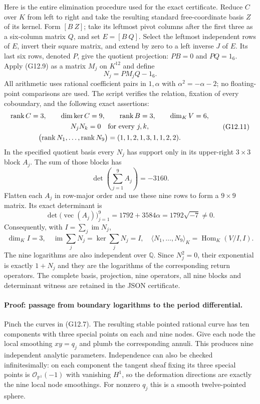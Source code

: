 Here is the entire elimination procedure used for the exact certificate.
Reduce $C$ over $K$ from left to right and take the resulting standard
free-coordinate basis $Z$ of its kernel. Form $[B\ Z]$; take its
leftmost pivot columns after the first three as a six-column matrix
$Q$, and set $E=[B\ Q]$. Select the leftmost independent rows of
$E$, invert their square matrix, and extend by zero to a left inverse
$J$ of $E$. Its last six rows, denoted $P$, give the quotient
projection: $PB=0$ and $PQ=1_6$. Apply (G12.9) as a matrix $M_j$ on
$K^{12}$ and define
\[
N_j=PM_jQ-1_6.
\tag{G12.10}
\]
All arithmetic uses rational coefficient pairs in $1,\alpha$ with
$\alpha^2=-\alpha-2$; no floating-point comparisons are used.
The script verifies the relation, fixation of every coboundary,
and the following exact assertions:
\[
\begin{gathered}
\operatorname{rank}C=3,\qquad \dim\ker C=9,\qquad
\operatorname{rank}B=3,\qquad\dim_KV=6,\\
N_jN_k=0\quad\hbox{for every }j,k,\\
\bigl(\operatorname{rank}N_1,\ldots,\operatorname{rank}N_9\bigr)
=(1,1,2,1,3,1,1,2,2).
\end{gathered}
\tag{G12.11}
\]
In the specified quotient basis every $N_j$ has support only in its
upper-right $3\times3$ block $A_j$. The sum of those blocks has
\[
\det\left(\sum_{j=1}^9 A_j\right)=-3160.
\tag{G12.12}
\]
Flatten each $A_j$ in row-major order and use these nine rows to
form a $9\times9$ matrix. Its exact determinant is
\[
\det\bigl(\operatorname{vec}(A_j)\bigr)_{j=1}^9
=1792+3584\alpha=1792\sqrt{-7}\ne0.
\tag{G12.13}
\]
Consequently, with $I=\sum_j\operatorname{im}N_j$,
\[
\dim_K I=3,\quad
\operatorname{im}\sum_jN_j=\ker\sum_jN_j=I,\quad
\langle N_1,\ldots,N_9\rangle_K
=\operatorname{Hom}_K(V/I,I).
\tag{G12.14}
\]
The nine logarithms are also independent over $\mathbb Q$.
Since $N_j^2=0$, their exponential is exactly $1+N_j$ and they
are the logarithms of the corresponding return operators.
The complete basis, projection, nine operators, all nine blocks
and determinant witness are retained in the JSON certificate.

\paragraph{Proof: passage from boundary logarithms to the period differential.}
Pinch the curves in (G12.7). The resulting stable pointed rational
curve has ten components with three special points on each and nine
nodes. Give each node the local smoothing $xy=q_j$ and plumb the
corresponding annuli. This produces nine independent analytic
parameters. Independence can also be checked infinitesimally:
on each component the tangent sheaf fixing its three special points
is $\mathcal O_{\mathbb P^1}(-1)$ with vanishing $H^1$, so the
deformation directions are exactly the nine local node smoothings.
For nonzero $q_j$ this is a smooth twelve-pointed sphere.

